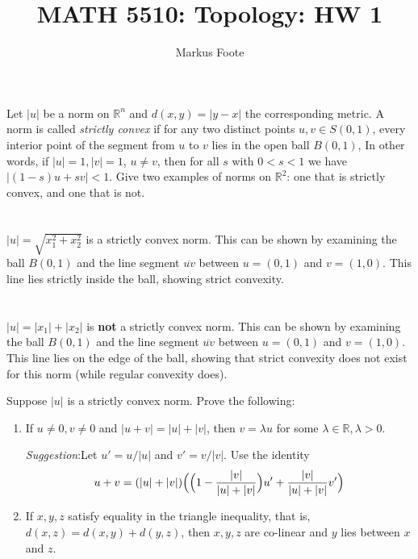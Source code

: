 \documentclass{jhwhw}
\title{MATH 5510: Topology: HW 1}
\author{Markus Foote}
\begin{document}
\problem{}%
 Let $|u|$ be a norm on $\mathbb{R}^n$ and $d(x,y) = |y - x|$ the corresponding metric. A norm is called \emph{strictly convex} if for any two distinct points $u,v\in S(0,1)$, every interior point of the segment from $u$ to $v$ lies in the open ball $B(0,1)$,  In other words, if $|u|=1, |v| = 1$, $u\ne v$, then for all $s$ with $0<s<1$ we have $|(1-s) u + s v |   <1$.  Give two examples of norms on $\mathbb{R}^2$: one that is strictly convex, and one that is not.

\solution{}
\part{}
$|u| = \sqrt{x_1^2+x_2^2}$ is a strictly convex norm. This can be shown by examining the ball $B(0,1)$ and the line segment $\overline{uv}$ between $u=(0,1)$ and $v=(1,0)$. This line lies strictly inside the ball, showing strict convexity.
\begin{center}
\end{center}

\part{}
$|u| = |x_1|+|x_2|$ is \textbf{not} a strictly convex norm. This can be shown by examining the ball $B(0,1)$ and the line segment $\overline{uv}$ between $u=(0,1)$ and $v=(1,0)$. This line lies on the edge of the ball, showing that strict convexity does not exist for this norm (while regular convexity does).
\begin{center}
\end{center}


\problem{} %
Suppose $|u|$ is a strictly convex norm. Prove the following:
\begin{enumerate}
	\item If $u\ne 0, v\ne 0$ and $|u + v| = |u| + |v|$, then $v = \lambda u$ for some $\lambda \in \mathbb{R}, \lambda >0$.
	
	\emph{Suggestion}:Let $ u' = u/|u|$ and $v' = v/|v|$. Use the identity
	$$
	u + v = (|u| + |v|) \Big{(} \Big{(}1 - \frac{|v|}{|u| + |v|}\Big{) }u' + \frac{|v|}{|u|+ |v|} v' \Big{)}
	$$
	
	\item If $x,y,z$ satisfy equality in the triangle inequality, that is, $d(x,z) = d(x,y) + d(y,z)$, then $x,y,z$ are co-linear and $y$ lies between $x$ and $z$.
\end{enumerate}
\end{document}
